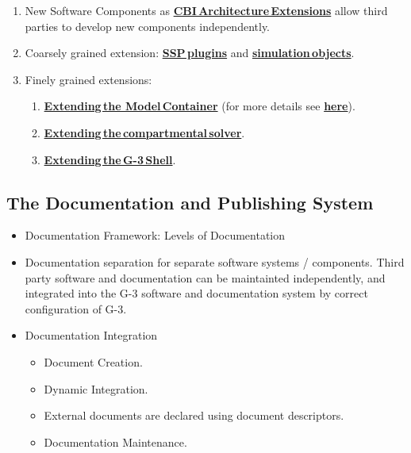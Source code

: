 \documentclass[12pt]{article}
\begin{document}
\begin{enumerate}
\item New Software Components as
  \href{../genesis-addto-component-developerpackage/genesis-addto-component-developerpackage.tex}{\bf CBI\,Architecture\,Extensions} allow third parties to develop new
  components independently.
\item Coarsely grained extension:
  \href{../genesis-add-feature-ssp/genesis-add-feature-ssp.tex}{\bf SSP\,plugins} and
  \href{../genesis-add-object-solver/genesis-add-object-solver.tex}{\bf simulation\,objects}.
\item Finely grained extensions:
  \begin{enumerate}
  \item
    \href{../genesis-extend-model-container/genesis-extend-model-container.tex}{\bf Extending\,the Model\,Container} (for more details see
    \href{../genesis-extend-model-container-detail/genesis-extend-model-container-detail.tex}{\bf here}).
  \item
    \href{../genesis-add-object-solver/genesis-add-object-solver.tex}{\bf Extending\,the\,compartmental\,solver}.
  \item \href{../genesis-add-object-solver/genesis-add-object-solver.tex}{\bf Extending\,the\,G-3\,Shell}.
  \end{enumerate}
\end{enumerate}



\subsection{The Documentation and Publishing System}

\begin{itemize}
\item Documentation Framework: Levels of Documentation
\item Documentation separation for separate software systems /
  components.  Third party software and documentation can be
  maintainted independently, and integrated into the G-3 software and
  documentation system by correct configuration of G-3.
\item Documentation Integration
  \begin{itemize}
  \item Document Creation.
  \item Dynamic Integration.
  \item External documents are declared using document descriptors.
  \item Documentation Maintenance.
  \end{itemize}
\end{itemize}
\end{document}

